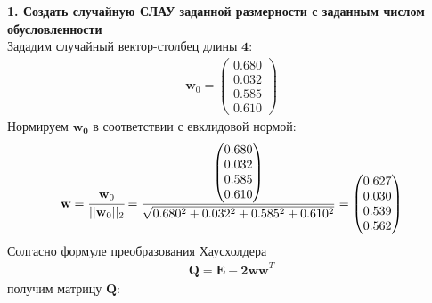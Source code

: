 





\setcounter{page}{2}
{\Large{\textbf{1. Создать случайную СЛАУ заданной размерности с заданным числом обусловленности}}}\\
Зададим случайный вектор-столбец длины $\mathbf{4}$:
\begin{align}
    \mathbf{w}_0 =
    \begin{pmatrix}
        0.680 \\
        0.032 \\
        0.585 \\
        0.610
    \end{pmatrix}
\end{align}
Нормируем $\mathbf{w_0}$ в соответствии с евклидовой нормой:
\begin{align}
    \mathbf{w} = \cfrac{\mathbf{w}_0}{||\mathbf{w}_0||_2} =
    \frac{
    \begin{pmatrix}
        0.680 \\
        0.032 \\
        0.585 \\
        0.610
    \end{pmatrix}}{\sqrt{0.680^2+0.032^2+0.585^2+0.610^2}} =
    \begin{pmatrix}
        0.627 \\
        0.030 \\
        0.539 \\
        0.562
    \end{pmatrix}
\end{align}
Солгасно формуле преобразования Хаусхолдера
\begin{align}
    \mathbf{Q = E - 2ww}^T
\end{align}
получим матрицу $\mathbf{Q}$:
